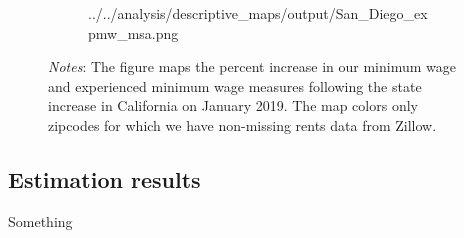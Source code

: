 \begin{figure}
\begin{subfigure}[b]{0.55\textwidth}
			{../../analysis/descriptive_maps/output/San_Diego_expmw_msa.png}
	\end{subfigure}
	\begin{minipage}{0.95\textwidth} \footnotesize
		\vspace{2mm} 
		\textit{Notes}: The figure maps the percent increase in our minimum wage and 
		experienced minimum wage measures following the state increase in California
		on January 2019. The map colors only zipcodes for which we have non-missing 
		rents data from Zillow.
	\end{minipage}
\end{figure}



\subsection{Estimation results}

Something

